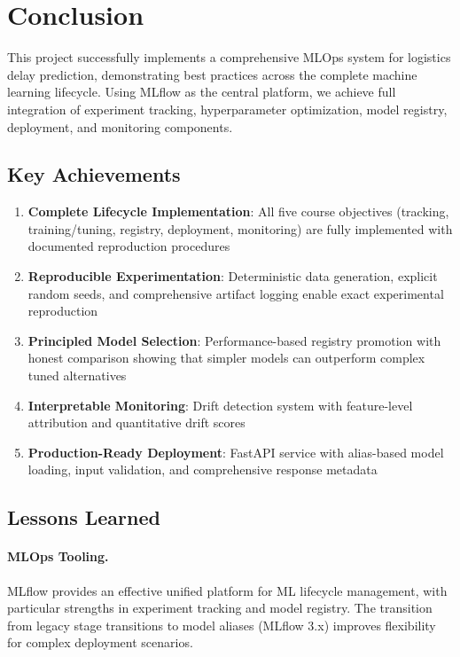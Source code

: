 \documentclass[11pt,a4paper]{article}
\begin{document}
\section{Conclusion}
\label{sec:conclusion}

This project successfully implements a comprehensive MLOps system for logistics delay prediction, demonstrating best practices across the complete machine learning lifecycle. Using MLflow as the central platform, we achieve full integration of experiment tracking, hyperparameter optimization, model registry, deployment, and monitoring components.

\subsection{Key Achievements}

\begin{enumerate}
    \item \textbf{Complete Lifecycle Implementation}: All five course objectives (tracking, training/tuning, registry, deployment, monitoring) are fully implemented with documented reproduction procedures
    
    \item \textbf{Reproducible Experimentation}: Deterministic data generation, explicit random seeds, and comprehensive artifact logging enable exact experimental reproduction
    
    \item \textbf{Principled Model Selection}: Performance-based registry promotion with honest comparison showing that simpler models can outperform complex tuned alternatives
    
    \item \textbf{Interpretable Monitoring}: Drift detection system with feature-level attribution and quantitative drift scores
    
    \item \textbf{Production-Ready Deployment}: FastAPI service with alias-based model loading, input validation, and comprehensive response metadata
\end{enumerate}

\subsection{Lessons Learned}

\paragraph{MLOps Tooling.}
MLflow provides an effective unified platform for ML lifecycle management, with particular strengths in experiment tracking and model registry. The transition from legacy stage transitions to model aliases (MLflow 3.x) improves flexibility for complex deployment scenarios.
\end{document}
